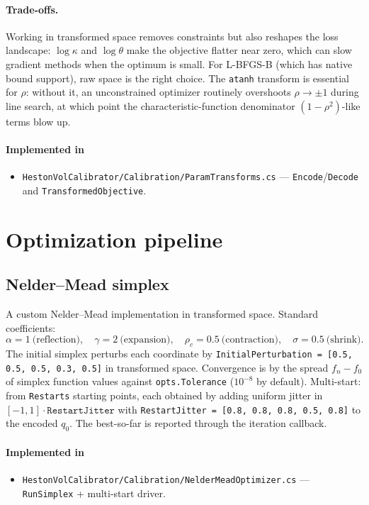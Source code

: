 \documentclass[11pt,a4paper]{article}
\begin{document}
\paragraph*{Trade-offs.} Working in transformed space removes constraints but
also reshapes the loss landscape: $\log\kappa$ and $\log\theta$ make the objective
flatter near zero, which can slow gradient methods when the optimum is small.
For L-BFGS-B (which has native bound support), raw space is the right choice.
The \texttt{atanh} transform is essential for $\rho$: without it, an unconstrained
optimizer routinely overshoots $\rho \to \pm 1$ during line search, at which
point the characteristic-function denominator $(1 - \rho^2)$-like terms blow up.

\paragraph*{Implemented in}
\begin{itemize}
\item \texttt{HestonVolCalibrator/Calibration/ParamTransforms.cs} --- \texttt{Encode}/\texttt{Decode} and \texttt{TransformedObjective}.
\end{itemize}

\section{Optimization pipeline}

\subsection{Nelder--Mead simplex}
A custom Nelder--Mead implementation in transformed space. Standard coefficients:
\[
\alpha = 1\ \text{(reflection)},\quad
\gamma = 2\ \text{(expansion)},\quad
\rho_c = 0.5\ \text{(contraction)},\quad
\sigma = 0.5\ \text{(shrink)}.
\]
The initial simplex perturbs each coordinate by \texttt{InitialPerturbation = [0.5, 0.5, 0.5, 0.3, 0.5]}
in transformed space. Convergence is by the spread $f_{n} - f_0$ of simplex
function values against \texttt{opts.Tolerance} ($10^{-8}$ by default).
Multi-start: from \texttt{Restarts} starting points, each obtained by adding
uniform jitter in $[-1,1]\cdot \texttt{RestartJitter}$ with
\texttt{RestartJitter = [0.8, 0.8, 0.8, 0.5, 0.8]} to the encoded $q_0$.
The best-so-far is reported through the iteration callback.

\paragraph*{Implemented in}
\begin{itemize}
\item \texttt{HestonVolCalibrator/Calibration/NelderMeadOptimizer.cs} --- \texttt{RunSimplex} + multi-start driver.
\end{itemize}
\end{document}

